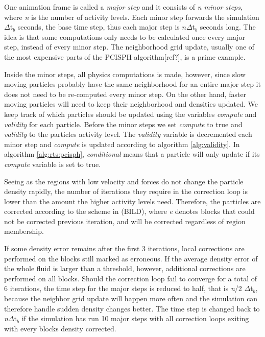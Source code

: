 \documentclass[../../main.tex]{subfiles}
\begin{document}
One animation frame is called a \textit{major step} and it consists of \textit{n minor steps}, where \textit{n} is the number of activity levels. Each minor step forwards the simulation $\Delta$t$_b$ seconds, the base time step, thus each major step is $n\Delta$t$_b$ seconds long. The idea is that some computations only needs to be calculated once every major step, instead of every minor step. The neighborhood grid update, usually one of the most expensive parts of the PCISPH algorithm[ref?], is a prime example. 

Inside the minor steps, all physics computations is made, however, since slow moving particles probably have the same neighborhood for an entire major step it does not need to be re-computed every minor step. On the other hand, faster moving particles will need to keep their neighborhood and densities updated. We keep track of which particles should be updated using the variables \textit{compute} and \textit{validity} for each particle. Before the minor steps we set \textit{compute} to true and \textit{validity} to the particles activity level. The \textit{validity} variable is decremented each minor step and \textit{compute} is updated according to algorithm \ref{alg:validity}. In algorithm \ref{alg:rts:pcisph}, \textit{conditional} means that a particle will only update if its \textit{compute} variable is set to true. 

Seeing as the regions with low velocity and forces do not change the particle density rapidly, the number of iterations they require in the correction loop is lower than the amount the higher activity levels need. Therefore, the particles are corrected according to the scheme in (BILD), where \textit{e} denotes blocks that could not be corrected previous iteration, and will be corrected regardless of region membership. 

If some density error remains after the first 3 iterations, local corrections are performed on the blocks still marked as erroneous. If the average density error of the whole fluid is larger than a threshold, however, additional corrections are performed on all blocks. Should the correction loop fail to converge for a total of 6 iterations, the time step for the major steps is reduced to half, that is \textit{n}/2 $\Delta$t$_b$, because the neighbor grid update will happen more often and the simulation can therefore handle sudden density changes better. The time step is changed back to \textit{n}$\Delta$t$_b$ if the simulation has run 10 major steps with all correction loops exiting with every blocks density corrected. 
\end{document}
